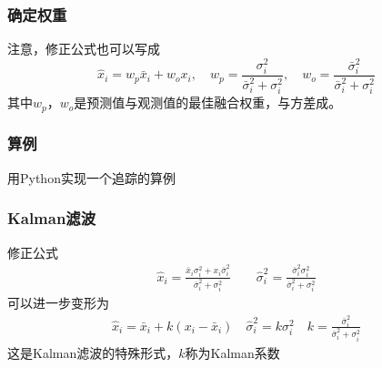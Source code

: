 \documentclass[14pt]{beamer}
\let\emph\relax %
\begin{document}
\begin{frame}
  \frametitle{确定权重}
  注意，修正公式也可以写成
  $$\hat{x}_i=w_p\bar{x}_i+w_o x_i,\quad
  w_p=\frac{\sigma_i^2}{\bar{\sigma}_i^2+\sigma_i^2},\quad
  w_o=\frac{\bar{\sigma}_i^2}{\bar{\sigma}_i^2+\sigma_i^2}$$
  其中$w_p$，$w_o$是预测值与观测值的最佳融合权重，与方差成\emph{反比例}。
\end{frame}

\begin{frame}
  \frametitle{算例}
  用Python实现一个追踪的算例
\end{frame}

\begin{frame}
  \frametitle{Kalman滤波}
  修正公式
  \begin{align*}
    \hat{x}_i = \frac{\bar{x}_i\sigma_i^2+x_i\bar{\sigma}_i^2}
    {\bar{\sigma}_i^2+\sigma_i^2}\qquad\hat{\sigma}_i^2=
    \frac{\bar{\sigma}_i^2\sigma_i^2}{\bar{\sigma}_i^2+\sigma_i^2}
  \end{align*}
  可以进一步变形为
  \begin{align*}
    \hat{x}_i=\bar{x}_i+k(x_i-\bar{x}_i)\quad
    \hat{\sigma}_i^2=k\sigma_i^2\quad
    k=\frac{\bar{\sigma}_i^2}{\bar{\sigma}_i^2+\sigma^2_i}
  \end{align*}
  这是Kalman滤波的特殊形式，$k$称为Kalman系数
\end{frame}
\end{document}
